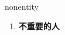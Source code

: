 
\begin{frame}
{\huge nonentity}
\begin{center}
\begin{enumerate}\Large
  \item \textbf{不重要的人}
\end{enumerate}
\end{center}
\end{frame}
